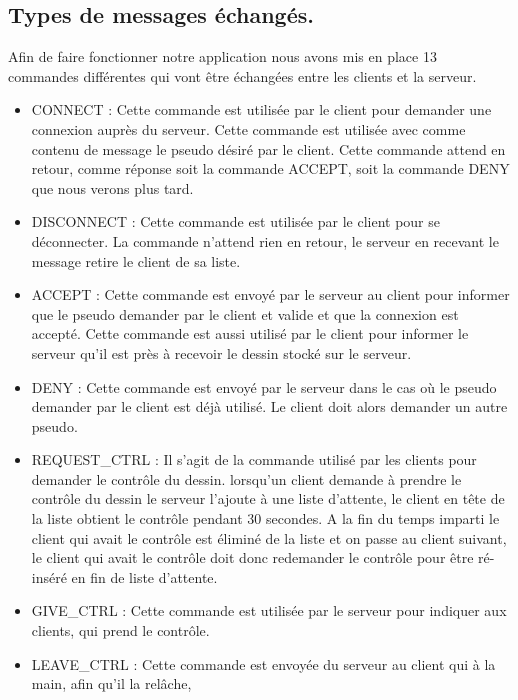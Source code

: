 \documentclass[a4paper,10pt]{article}
\begin{document}
\begin{multicols}{2}
\section{Types de messages échangés.}
Afin de faire fonctionner notre application nous avons mis en place 13 commandes différentes qui vont être échangées entre les clients et la serveur.
\begin{itemize}
\item CONNECT : Cette commande est utilisée par le client pour demander une connexion auprès du serveur. Cette commande est utilisée avec comme contenu de message le pseudo désiré par le client. Cette commande attend en retour, comme réponse soit la commande ACCEPT, soit la commande DENY que nous verons plus tard.

\item DISCONNECT : Cette commande est utilisée par le client pour se déconnecter. La commande n'attend rien en retour, le serveur en recevant le message retire le client de sa liste.

\item ACCEPT : Cette commande est envoyé par le serveur au client pour informer que le pseudo demander par le client et valide et que la connexion est accepté. Cette commande est aussi utilisé par le client pour informer le serveur qu'il est près à recevoir le dessin stocké sur le serveur.

\item DENY : Cette commande est envoyé par le serveur dans le cas où le pseudo demander par le client est déjà utilisé. Le client doit alors demander un autre pseudo.

\item  REQUEST_CTRL : Il s'agit de la commande utilisé par les clients pour demander le contrôle du dessin.   lorsqu'un client demande à prendre le contrôle du dessin le serveur l'ajoute à une liste d'attente, le client en tête de la liste obtient le contrôle pendant 30 secondes. A la fin du temps imparti le client qui avait le contrôle est éliminé de la liste et on passe au client suivant, le client qui avait le contrôle doit donc redemander le contrôle pour être ré-inséré en fin de liste d'attente.

\item GIVE_CTRL : Cette commande est utilisée par le serveur pour indiquer aux clients, qui prend le contrôle. 

\item LEAVE_CTRL : Cette commande est envoyée du serveur au client qui à la main, afin qu'il la relâche,


\end{itemize}
\end{multicols}
\end{document}
